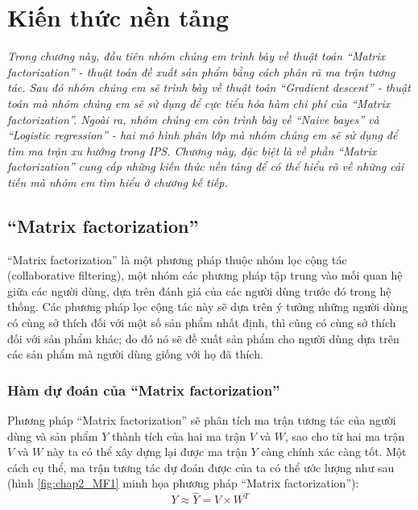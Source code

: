 \chapter{Kiến thức nền tảng}
\label{Chapter2}

\noindent \textit{Trong chương này, đầu tiên nhóm chúng em trình bày về thuật toán ``Matrix factorization'' - thuật toán đề xuất sản phẩm bằng cách phân rã ma trận tương tác. Sau đó nhóm chúng em sẽ trình bày về thuật toán ``Gradient descent'' - thuật toán mà nhóm chúng em sẽ sử dụng để cực tiểu hóa hàm chi phí của  ``Matrix factorization''. Ngoài ra, nhóm chúng em còn trình bày về ``Naive bayes'' và ``Logistic regression'' - hai mô hình phân lớp mà nhóm chúng em sẽ sử dụng để tìm ma trận xu hướng trong IPS. Chương này, đặc biệt là về phần ``Matrix factorization'' cung cấp những kiến thức nền tảng để có thể hiểu rõ về những cải tiến mà nhóm em tìm hiểu ở chương kế tiếp.}

\section{``Matrix factorization''}
``Matrix factorization'' là một phương pháp thuộc nhóm lọc cộng tác (collaborative filtering), một nhóm các phương pháp tập trung vào mối quan hệ giữa các người dùng, dựa trên đánh giá của các người dùng trước đó trong hệ thống. Các phương pháp lọc cộng tác này sẽ dựa trên ý tưởng những người dùng có cùng sở thích đối với một số sản phẩm nhất định, thì cũng có cùng sở thích đối với sản phẩm khác; do đó nó sẽ đề xuất sản phẩm cho người dùng dựa trên các sản phẩm mà người dùng giống với họ đã thích.

\subsection{Hàm dự đoán của ``Matrix factorization''}
Phương pháp ``Matrix factorization'' sẽ phân tích ma trận tương tác của người dùng và sản phẩm $Y$ thành tích của hai ma trận $V$ và $W$, sao cho từ hai ma trận $V$ và $W$ này ta có thể xây dựng lại được ma trận $Y$ càng chính xác càng tốt. Một cách cụ thể, ma trận tương tác dự đoán được của ta có thể ước lượng như sau (hình \ref{fig:chap2_MF1} minh họa phương pháp ``Matrix factorization''):
\begin{equation}
\label{eq:2.1_MF}
    Y \approx \hat{Y} = V \times W^T
\end{equation}


